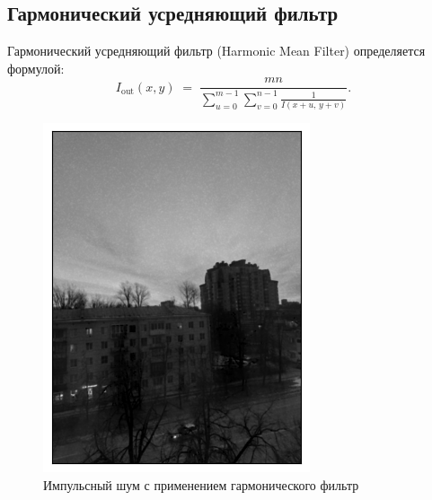 \documentclass[a4paper,12pt]{article}
\begin{document}
\subsection{Гармонический усредняющий фильтр}
Гармонический усредняющий фильтр (Harmonic Mean Filter) определяется формулой:
\begin{equation}
I_{\text{out}}(x,y) \;=\;
\frac{mn}{
\displaystyle \sum_{u=0}^{m-1}\sum_{v=0}^{n-1}
\frac{1}{I(x+u,\,y+v)}
}.
\end{equation}
\begin{figure}[H]
    \begin{minipage}{0.49\textwidth}
        \centering \includegraphics[width=\textwidth]{results/lpf_sap_3.png}
        \caption{Импульсный шум с применением гармонического фильтр}
    \end{minipage}\hfill
    \begin{minipage}{0.49\textwidth}

\end{minipage}
\end{figure}
\end{document}
